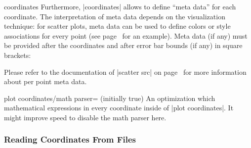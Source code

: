 \begin{addplotoperation}[]{coordinates}{}
Furthermore, |coordinates| allows to define ``meta data'' for each coordinate. The interpretation of meta data depends on the visualization technique: for scatter plots, meta data can be used to define colors or style associations for every point (see page~\pageref{pgfplots:scatterclasses} for an example). Meta data (if any) must be provided after the coordinates and after error bar bounds (if any) in square brackets:
\begin{codeexample}[]
\end{codeexample}
Please refer to the documentation of |scatter src| on page~\pageref{pgfplots:scatter:src} for more information about per point meta data.
\end{addplotoperation}

\begin{pgfplotskey}{plot coordinates/math parser= (initially true)}
	An optimization which mathematical expressions in every coordinate inside of |plot coordinates|. It might improve speed to disable the math parser here.
\end{pgfplotskey}

\subsubsection{Reading Coordinates From Files}

